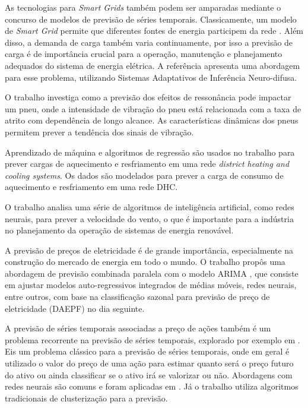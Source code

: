 As tecnologias para \textit{Smart Grids} também podem ser amparadas mediante o concurso de modelos de previsão de séries temporais. Classicamente, um modelo de \emph{Smart Grid} permite que diferentes fontes de energia participem da rede \cite{8408964}. Além disso, a demanda de carga também varia continuamente, por isso a previsão de carga é de importância crucial para a operação, manutenção e planejamento adequados do sistema de energia elétrica. A referência \cite{8408964} apresenta uma abordagem para esse problema, utilizando Sistemas Adaptativos de Inferência Neuro-difusa.

O trabalho \cite{8410563} investiga como a previsão dos efeitos de ressonância pode impactar um pneu, onde a intensidade de vibração do pneu está relacionada com a taxa de atrito com dependência de longo alcance. As características dinâmicas dos pneus permitem prever a tendência dos sinais de vibração.

Aprendizado de máquina e algoritmos de regressão são usados no trabalho \cite{8403331} para prever cargas de aquecimento e resfriamento em uma rede \textit{district heating and cooling systems}. Os dados são modelados para prever a carga de consumo de aquecimento e resfriamento em uma rede DHC.

O trabalho \cite{8408773} analisa uma série de algoritmos de inteligência artificial, como redes neurais, para prever a velocidade do vento, o que é importante para a indústria no planejamento da operação de sistemas de energia renovável.

A previsão de preços de eletricidade é de grande importância, especialmente na construção do mercado de energia em todo o mundo. O trabalho \cite{8403372} propôs uma abordagem de previsão combinada paralela com o modelo ARIMA \cite{box1970time}, que consiste em ajustar modelos auto-regressivos integrados de médias móveis, redes neurais, entre outros, com base na classificação sazonal para previsão de preço de eletricidade (DAEPF) no dia seguinte. 

A previsão de séries temporais associadas a preço de ações também é um problema recorrente na previsão de séries temporais, explorado por exemplo em \cite{8410278, 7310722}. Eis um problema clássico para a previsão de séries temporais, onde em geral é utilizado o valor do preço de uma ação para estimar quanto será o preço futuro do ativo ou ainda classificar se o ativo irá se valorizar ou não. Abordagens com redes neurais são comuns e foram aplicadas em \cite{8410278}. Já o trabalho \cite{7310722} utiliza algoritmos tradicionais de clusterização para a previsão.


